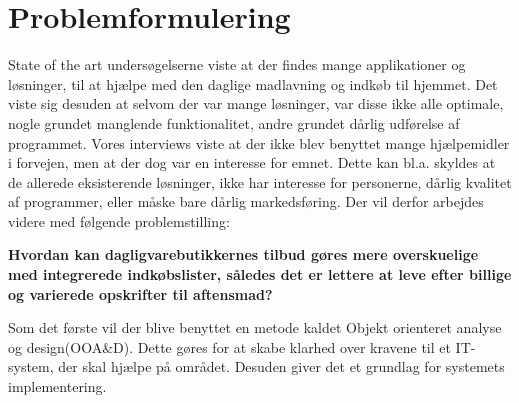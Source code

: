 \chapter{Problemformulering}

State of the art undersøgelserne viste at der findes mange applikationer og løsninger, til at hjælpe med den daglige madlavning og indkøb til hjemmet. 
Det viste sig desuden at selvom der var mange løsninger, var disse ikke alle optimale, nogle grundet manglende funktionalitet, andre grundet dårlig udførelse af programmet. 
Vores interviews viste at der ikke blev benyttet mange hjælpemidler i forvejen, men at der dog var en interesse for emnet.
Dette kan bl.a. skyldes at de allerede eksisterende løsninger, ikke har interesse for personerne, dårlig kvalitet af programmer, eller måske bare dårlig markedsføring. Der vil derfor arbejdes videre med følgende problemstilling:

\textbf{Hvordan kan dagligvarebutikkernes tilbud gøres mere overskuelige med integrerede indkøbslister, således det er lettere at leve efter billige og varierede opskrifter til aftensmad?}

Som det første vil der blive benyttet en metode kaldet Objekt orienteret analyse og design(OOA\&D).
Dette gøres for at skabe klarhed over kravene til et IT-system, der skal hjælpe på området. Desuden giver det et grundlag for systemets implementering. 